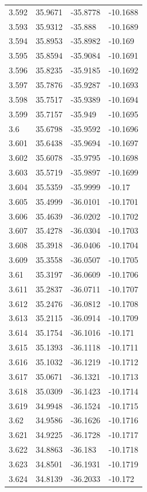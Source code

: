 \begin{tabular}{llll}
3.592 & 35.9671 & -35.8778 & -10.1688 \\
3.593 & 35.9312 & -35.888 & -10.1689 \\
3.594 & 35.8953 & -35.8982 & -10.169 \\
3.595 & 35.8594 & -35.9084 & -10.1691 \\
3.596 & 35.8235 & -35.9185 & -10.1692 \\
3.597 & 35.7876 & -35.9287 & -10.1693 \\
3.598 & 35.7517 & -35.9389 & -10.1694 \\
3.599 & 35.7157 & -35.949 & -10.1695 \\
3.6 & 35.6798 & -35.9592 & -10.1696 \\
3.601 & 35.6438 & -35.9694 & -10.1697 \\
3.602 & 35.6078 & -35.9795 & -10.1698 \\
3.603 & 35.5719 & -35.9897 & -10.1699 \\
3.604 & 35.5359 & -35.9999 & -10.17 \\
3.605 & 35.4999 & -36.0101 & -10.1701 \\
3.606 & 35.4639 & -36.0202 & -10.1702 \\
3.607 & 35.4278 & -36.0304 & -10.1703 \\
3.608 & 35.3918 & -36.0406 & -10.1704 \\
3.609 & 35.3558 & -36.0507 & -10.1705 \\
3.61 & 35.3197 & -36.0609 & -10.1706 \\
3.611 & 35.2837 & -36.0711 & -10.1707 \\
3.612 & 35.2476 & -36.0812 & -10.1708 \\
3.613 & 35.2115 & -36.0914 & -10.1709 \\
3.614 & 35.1754 & -36.1016 & -10.171 \\
3.615 & 35.1393 & -36.1118 & -10.1711 \\
3.616 & 35.1032 & -36.1219 & -10.1712 \\
3.617 & 35.0671 & -36.1321 & -10.1713 \\
3.618 & 35.0309 & -36.1423 & -10.1714 \\
3.619 & 34.9948 & -36.1524 & -10.1715 \\
3.62 & 34.9586 & -36.1626 & -10.1716 \\
3.621 & 34.9225 & -36.1728 & -10.1717 \\
3.622 & 34.8863 & -36.183 & -10.1718 \\
3.623 & 34.8501 & -36.1931 & -10.1719 \\
3.624 & 34.8139 & -36.2033 & -10.172 \\

\end{tabular}
